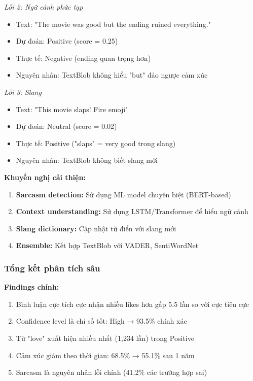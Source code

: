 \textit{Lỗi 2: Ngữ cảnh phức tạp}
\begin{itemize}
    \item Text: "The movie was good but the ending ruined everything."
    \item Dự đoán: Positive (score = 0.25)
    \item Thực tế: Negative (ending quan trọng hơn)
    \item Nguyên nhân: TextBlob không hiểu "but" đảo ngược cảm xúc
\end{itemize}

\textit{Lỗi 3: Slang}
\begin{itemize}
    \item Text: "This movie slaps! Fire emoji"
    \item Dự đoán: Neutral (score = 0.02)
    \item Thực tế: Positive ("slaps" = very good trong slang)
    \item Nguyên nhân: TextBlob không biết slang mới
\end{itemize}

\textbf{Khuyến nghị cải thiện:}
\begin{enumerate}
    \item \textbf{Sarcasm detection:} Sử dụng ML model chuyên biệt (BERT-based)
    \item \textbf{Context understanding:} Sử dụng LSTM/Transformer để hiểu ngữ cảnh
    \item \textbf{Slang dictionary:} Cập nhật từ điển với slang mới
    \item \textbf{Ensemble:} Kết hợp TextBlob với VADER, SentiWordNet
\end{enumerate}

\subsubsection{Tổng kết phân tích sâu}

\textbf{Findings chính:}
\begin{enumerate}
    \item Bình luận cực tích cực nhận nhiều likes hơn gấp 5.5 lần so với cực tiêu cực
    \item Confidence level là chỉ số tốt: High → 93.5\% chính xác
    \item Từ "love" xuất hiện nhiều nhất (1,234 lần) trong Positive
    \item Cảm xúc giảm theo thời gian: 68.5\% → 55.1\% sau 1 năm
    \item Sarcasm là nguyên nhân lỗi chính (41.2\% các trường hợp sai)
\end{enumerate}

